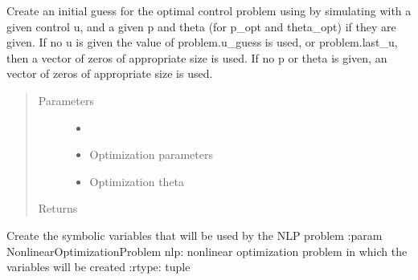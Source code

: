 \documentclass[letterpaper,10pt,english]{sphinxmanual}
\begin{document}
\begin{fulllineitems}
\begin{fulllineitems}
\label{\detokenize{yaocptool.methods.classic:yaocptool.methods.classic.collocationscheme.CollocationScheme.create_initial_guess_with_simulation}}
Create an initial guess for the optimal control problem using by simulating with a given control u,
and a given p and theta (for p\_opt and theta\_opt) if they are given.
If no u is given the value of problem.u\_guess is used, or problem.last\_u, then a vector of zeros of appropriate
size is used.
If no p or theta is given, an vector of zeros of appropriate size is used.
\begin{quote}\begin{description}
\item[{Parameters}] \leavevmode\begin{itemize}
\item {} 
 \textendash{} 

\item {} 
 \textendash{} Optimization parameters

\item {} 
 \textendash{} Optimization theta

\end{itemize}

\item[{Returns}] \leavevmode


\end{description}\end{quote}

\end{fulllineitems}


\begin{fulllineitems}
\label{\detokenize{yaocptool.methods.classic:yaocptool.methods.classic.collocationscheme.CollocationScheme._create_nlp_symbolic_variables}}
Create the symbolic variables that will be used by the NLP problem
:param NonlinearOptimizationProblem nlp: nonlinear optimization problem in which the variables will be created
:rtype: tuple


\end{fulllineitems}
\end{fulllineitems}
\end{document}
